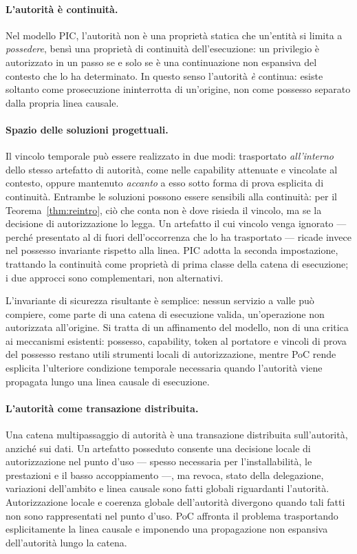 \documentclass[11pt]{article}
\begin{document}
\paragraph{L'autorità è continuità.}
Nel modello PIC, l'autorità non è una proprietà statica che un'entità si limita
a \emph{possedere}, bensì una proprietà di continuità dell'esecuzione: un
privilegio è autorizzato in un passo se e solo se è una continuazione non
espansiva del contesto che lo ha determinato. In questo senso l'autorità
\emph{è} continua: esiste soltanto come prosecuzione ininterrotta di un'origine,
non come possesso separato dalla propria linea causale.

\paragraph{Spazio delle soluzioni progettuali.}
Il vincolo temporale può essere realizzato in due modi: trasportato
\emph{all'interno} dello stesso artefatto di autorità, come nelle capability
attenuate e vincolate al contesto, oppure mantenuto \emph{accanto} a esso sotto
forma di prova esplicita di continuità. Entrambe le soluzioni possono essere
sensibili alla continuità: per il Teorema~\ref{thm:reintro}, ciò che conta non è
dove risieda il vincolo, ma se la decisione di autorizzazione lo legga. Un
artefatto il cui vincolo venga ignorato --- perché presentato al di fuori
dell'occorrenza che lo ha trasportato --- ricade invece nel possesso invariante
rispetto alla linea. PIC adotta la seconda impostazione, trattando la continuità
come proprietà di prima classe della catena di esecuzione; i due approcci sono
complementari, non alternativi.

L'invariante di sicurezza risultante è semplice: nessun servizio a valle può
compiere, come parte di una catena di esecuzione valida, un'operazione non
autorizzata all'origine. Si tratta di un affinamento del modello, non di una
critica ai meccanismi esistenti: possesso, capability, token al portatore e
vincoli di prova del possesso restano utili strumenti locali di autorizzazione,
mentre PoC rende esplicita l'ulteriore condizione temporale necessaria quando
l'autorità viene propagata lungo una linea causale di esecuzione.

\paragraph{L'autorità come transazione distribuita.}
Una catena multipassaggio di autorità è una transazione distribuita
sull'autorità, anziché sui dati. Un artefatto posseduto consente una decisione
locale di autorizzazione nel punto d'uso --- spesso necessaria per
l'installabilità, le prestazioni e il basso accoppiamento ---, ma revoca, stato
della delegazione, variazioni dell'ambito e linea causale sono fatti globali
riguardanti l'autorità. Autorizzazione locale e coerenza globale dell'autorità
divergono quando tali fatti non sono rappresentati nel punto d'uso. PoC affronta
il problema trasportando esplicitamente la linea causale e imponendo una
propagazione non espansiva dell'autorità lungo la catena.
\end{document}

